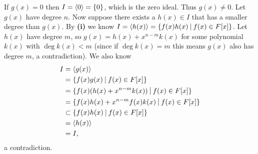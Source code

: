 \begin{questions}
\begin{partquestions}{\roman*}
        \item If $g(x) = 0$ then $I = \left\langle0\right\rangle = \{0\}$, which is the zero ideal. Thus $g(x) \neq 0$. Let $g(x)$ have degree $n$. Now suppose there exists a $h(x) \in I$ that has a smaller degree than $g(x)$. By \textbf{(i)} we know $I = \princ{h(x)} = \{f(x)h(x) \vert f(x) \in F[x]\}$. Let $h(x)$ have degree $m$, so $g(x) = h(x) + x^{n-m}k(x)$ for some polynomial $k(x)$ with $\deg k(x) < m$ (since if $\deg k(x) = m$ this means $g(x)$ also has degree $m$, a contradiction). We also know
        \begin{align*}
            I &= \princ{g(x)}\\
            &= \{f(x)g(x) \vert f(x) \in F[x]\}\\
            &= \{f(x)(h(x) + x^{n-m}k(x)) \vert f(x) \in F[x]\}\\
            &= \{f(x)h(x) + x^{n-m}f(x)k(x) \vert f(x) \in F[x]\}\\
            &\subset \{f(x)h(x) \vert f(x) \in F[x]\}\\
            &= \princ{h(x)}\\
            &= I,
        \end{align*}
        a contradiction.
    \end{partquestions}
    

\end{questions}
